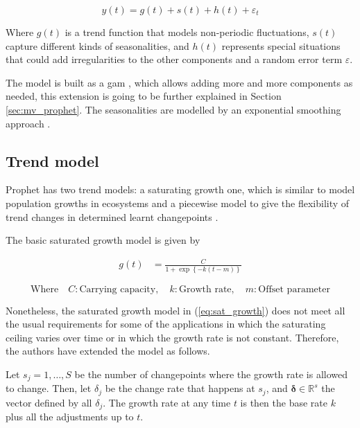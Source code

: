 \begin{equation}
	\label{eq:prophet_def}
	y(t) = g(t) + s(t) + h(t) + \varepsilon_t
\end{equation}

Where $g(t)$ is a trend function that models non-periodic fluctuations, $s(t)$ capture different kinds of seasonalities, and $h(t)$ represents special situations that could add irregularities to the other components and a random error term $\varepsilon$.

The model is built as a \ac{gam} \cite{hastie1987generalized}, which allows adding more and more components as needed, this extension is going to be further explained in Section \ref{sec:mv_prophet}. The seasonalities are modelled by an exponential smoothing approach \cite{gardner1985exponential}.

\subsection{Trend model}

Prophet has two trend models: a saturating growth one, which is similar to model population growths in ecosystems  \cite{hutchinson1978introduction} and a piecewise model to give the flexibility of trend changes in determined learnt changepoints \cite{fb_prophet}.

The basic saturated growth model is given by

\begin{align}\label{eq:sat_growth}
	g(t) &= \frac{C}{1 + \exp\left\{ -k(t-m) \right\}}
\end{align}

\begin{equation*}
	\text{Where} \quad
	C: \text{Carrying capacity}, \quad
	k: \text{Growth rate}, \quad
	m: \text{Offset parameter}
\end{equation*}

Nonetheless, the saturated growth model in (\ref{eq:sat_growth}) does not meet all the usual requirements for some of the applications in which the saturating ceiling varies over time or in which the growth rate is not constant. Therefore, the authors have extended the model as follows.

Let $s_j=1,\ldots, S$ be the number of changepoints where the growth rate is allowed to change. Then, let $\delta_j$ be the change rate that happens at $s_j$, and $\bm{\delta} \in \mathbb{R}^s$ the vector defined by all $\delta_j$. The growth rate at any time $t$ is then the base rate $k$ plus all the adjustments up to $t$.

